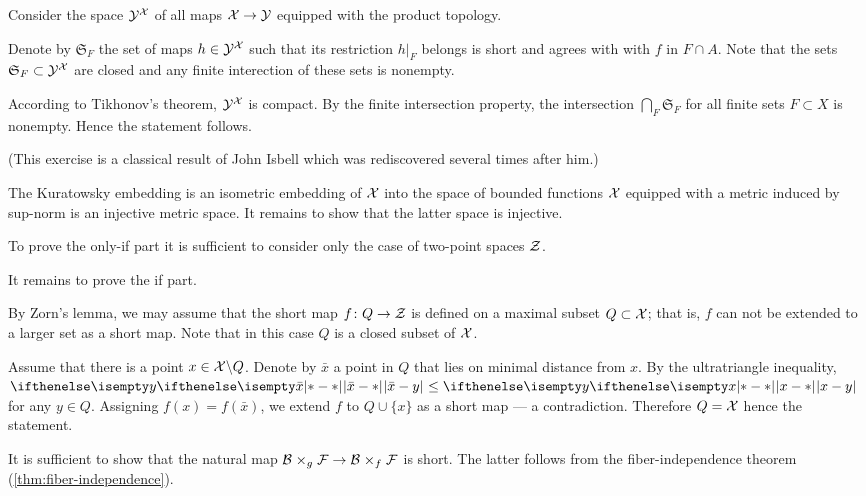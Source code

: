 

 Consider the space $\mathcal{Y}^{\mathcal{X}}$ of all maps $\spc{X}\to \spc{Y}$ equipped with the product topology.

Denote by $\mathfrak{S}_F$ the set of maps $h\in \spc{Y}^\spc{X}$ such that its restriction $h|_F$ belongs is short and agrees with with $f$ in $F\cap A$.
Note that the sets $\mathfrak{S}_F\subset \spc{Y}^\spc{X}$ are closed and any finite interection of these sets is nonempty.

According to Tikhonov's theorem, $\mathcal{Y}^{\mathcal{X}}$ is compact.
By the finite intersection property, the intersection $\bigcap_F\mathfrak{S}_F$ for all finite sets $F\subset X$ is nonempty.
Hence the statement follows.

(This exercise is a classical result of John Isbell which was rediscovered several times after him.)

The Kuratowsky embedding is an isometric embedding of $\mathcal{X}$ into the space of bounded functions $\mathcal{X}$ equipped with a metric induced by sup-norm is an injective metric space.
It remains to show that the latter space is injective.


To prove the only-if part it is sufficient to consider only the case of two-point spaces $\mathcal{Z}$.

It remains to prove the if part.

By Zorn's lemma, we may assume that the short map $f\:Q\to \spc{Z}$ is defined on a maximal subset $Q\subset \spc{X}$;
that is, $f$ can not be extended to a larger set as a short map.
Note that in this case $Q$ is a closed subset of $\mathcal{X}$.

Assume that there is a point $x\in \spc{X}\backslash Q$.
Denote by $\bar x$ a point in $Q$ that lies on minimal distance from $x$.
By the ultratriangle inequality, $\dist{\bar x}{y}{}\le\dist{x}{y}{}$ for any $y\in Q$.
Assigning $f(x)=f(\bar x)$, we extend $f$ to $Q\cup\{x\}$ as a short map --- a contradiction.
Therefore $Q=\mathcal{X}$ hence the statement.


It is sufficient to show that the natural map $\spc{B}\warp{g}\spc{F}\to \spc{B}\warp{f}\spc{F}$ is short.
The latter follows from the fiber-independence theorem (\ref{thm:fiber-independence}).


